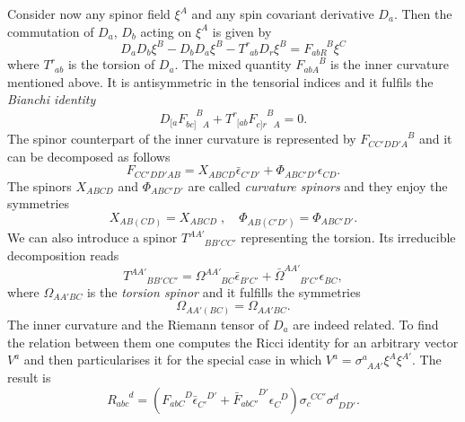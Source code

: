 \documentclass[final,3p,times,twocolumn]{elsarticle}
\begin{document}
Consider now any spinor field $\xi^A$ and any spin covariant derivative $D_a$. 
Then the commutation of $D_a$, $D_b$ acting on $\xi^A$ is given by \cite{ASHTEKAR}
\begin{equation}
D_aD_b\xi^B-D_bD_a\xi^B-T^r_{\phantom{r}ab}D_r\xi^B=F_{abR}^{\phantom{abC}B}\xi^C
\label{eq:ricci-identity-F}
\end{equation}
where $T^r_{\phantom{r}ab}$ is the torsion of $D_a$. The mixed quantity $F_{abA}^{\phantom{abA}B}$ is the inner curvature mentioned above. It is antisymmetric in the tensorial indices and it fulfils the {\em Bianchi identity} \cite{ASHTEKAR}
\begin{equation}
D_{[a}F_{bc]\phantom{B}A}^{\phantom{bc]}B}+T_{\phantom{r}[ab}^rF_{c]r\phantom{B}A}^{\phantom{c]r}B}=0.
\label{eq:F-bianchi-identity} 
\end{equation}
The spinor counterpart of the inner curvature is represented by 
$F_{CC'DD'A}^{\phantom{CC'DD'A}B}$ and it can be decomposed as follows
\begin{equation}
F_{CC'DD'AB}=X_{ABCD}\bar{\epsilon}_{C'D'}+\Phi_{ABC'D'}\epsilon_{CD}. 
\label{curvature-spinors} 
\end{equation}
The spinors $X_{ABCD}$ and $\Phi_{ABC'D'}$ are called {\em curvature spinors} and they enjoy the symmetries
\begin{equation}
X_{AB(CD)}=X_{ABCD}\;,\quad
\Phi_{AB(C'D')}=\Phi_{ABC'D'}. 
\end{equation}
We can also introduce a spinor $T^{AA'}_{\phantom{AA'}BB'CC'}$ representing the torsion. Its irreducible decomposition reads
\begin{equation}
T^{AA'}_{\phantom{AA'}BB'CC'}=\Omega^{AA'}_{\phantom{AA'}BC}\bar{\epsilon}_{B'C'}
+\bar{\Omega}^{AA'}_{\phantom{AA'}B'C'}\epsilon_{BC}, 
\label{eq:torsion-decomposition}
\end{equation}
where $\Omega_{AA'BC}$ is the {\em torsion spinor} and it fulfills the symmetries
\begin{equation}
\Omega_{AA'(BC)}=\Omega_{AA'BC}.
\end{equation}
The inner curvature and the Riemann tensor of $D_a$ are indeed related. To find the relation between them one computes the Ricci identity for an arbitrary vector $V^a$ and then particularises it for the special case in which $V^a=\sigma^a_{\phantom{a}AA'}\xi^A\xi^{A'}$.
The result is 
\begin{equation}
R_{abc}^{\phantom{abc}d}=(F_{abC}^{\phantom{abC}D}\bar{\epsilon}_{C'}^{\phantom{C'}D'}
+\bar{F}_{abC'}^{\phantom{abC'}D'}\epsilon_{C}^{\phantom{C}D})\sigma_{c}^{\phantom{c}CC'}
\sigma^d_{\phantom{d}DD'}.
\label{eq:decompose-riemann} 
\end{equation}
\end{document}
